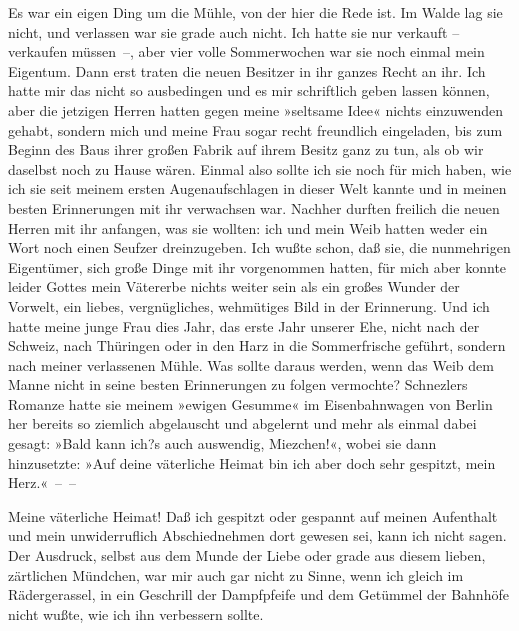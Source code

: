 Es war ein eigen Ding um die Mühle, von der hier die Rede ist. Im
Walde lag sie nicht, und verlassen war sie grade auch nicht. Ich
hatte sie nur verkauft – verkaufen müssen~–, aber vier volle
Sommerwochen war sie noch einmal mein Eigentum. Dann erst traten
die neuen Besitzer in ihr ganzes Recht an ihr. Ich hatte mir das
nicht so ausbedingen und es mir schriftlich geben lassen können,
aber die jetzigen Herren hatten gegen meine »seltsame Idee« nichts
einzuwenden gehabt, sondern mich und meine Frau sogar recht
freundlich eingeladen, bis zum Beginn des Baus ihrer großen Fabrik
auf ihrem Besitz ganz zu tun, als ob wir daselbst noch zu Hause
wären. Einmal also sollte ich sie noch für mich haben, wie ich sie
seit meinem ersten Augenaufschlagen in dieser Welt kannte und in
meinen besten Erinnerungen mit ihr verwachsen war. Nachher durften
freilich die neuen Herren mit ihr anfangen, was sie wollten: ich
und mein Weib hatten weder ein Wort noch einen Seufzer
dreinzugeben. Ich wußte schon, daß sie, die nunmehrigen Eigentümer,
sich große Dinge mit ihr vorgenommen hatten, für mich aber konnte
leider Gottes mein Vätererbe nichts weiter sein als ein großes
Wunder der Vorwelt, ein liebes, vergnügliches, wehmütiges Bild in
der Erinnerung. Und ich hatte meine junge Frau dies Jahr, das erste
Jahr unserer Ehe, nicht nach der Schweiz, nach Thüringen oder in
den Harz in die Sommerfrische geführt, sondern nach meiner
verlassenen Mühle. Was sollte daraus werden, wenn das Weib dem
Manne nicht in seine besten Erinnerungen zu folgen vermochte?
Schnezlers Romanze hatte sie meinem »ewigen Gesumme« im
Eisenbahnwagen von Berlin her bereits so ziemlich abgelauscht und
abgelernt und mehr als einmal dabei gesagt: »Bald kann ich?s auch
auswendig, Miezchen!«, wobei sie dann hinzusetzte: »Auf deine
väterliche Heimat bin ich aber doch sehr gespitzt, mein Herz.«~–~–

Meine väterliche Heimat! Daß ich gespitzt oder gespannt auf meinen
Aufenthalt und mein unwiderruflich Abschiednehmen dort gewesen sei,
kann ich nicht sagen. Der Ausdruck, selbst aus dem Munde der Liebe
oder grade aus diesem lieben, zärtlichen Mündchen, war mir auch gar
nicht zu Sinne, wenn ich gleich im Rädergerassel, in ein Geschrill
der Dampfpfeife und dem Getümmel der Bahnhöfe nicht wußte, wie ich
ihn verbessern sollte.


